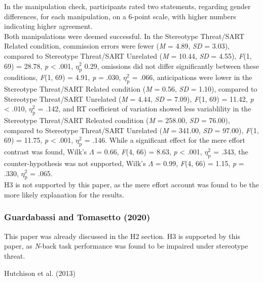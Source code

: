 \documentclass[
  stu,floatsintext]{apa7}
\begin{document}
In the manipulation check, participants rated two statements, regarding gender differences, for each manipulation, on a 6-point scale, with higher numbers indicating higher agreement.\\
Both manipulations were deemed successful.
In the Stereotype Threat/SART Related condition, commission errors were fewer (\emph{M} = 4.89, \emph{SD} = 3.03), compared to Stereotype Threat/SART Unrelated (\emph{M} = 10.44, \emph{SD} = 4.55), \emph{F}(1, 69) = 28.78, \emph{p} \textless{} .001, \(\eta^{2}_{\text{p}}\) 0.29, omissions did not differ significantly between these conditions, \emph{F}(1, 69) = 4.91, \emph{p} = .030, \(\eta^{2}_{\text{p}}\) = .066, anticipations were lower in the Stereotype Threat/SART Related condition (\emph{M} = 0.56, \emph{SD} = 1.10), compared to Stereotype Threat/SART Unrelated (\emph{M} = 4.44, \emph{SD} = 7.09), \emph{F}(1, 69) = 11.42, \emph{p} \textless{} .010, \(\eta^{2}_{\text{p}}\) = .142, and RT coefficient of variation showed less variablility in the Stereotype Threat/SART Releated condition (\emph{M} = 258.00, \emph{SD} = 76.00), compared to Stereotype Threat/SART Unrelated (\emph{M} = 341.00, \emph{SD} = 97.00), \emph{F}(1, 69) = 11.75, \emph{p} \textless{} .001, \(\eta^{2}_{\text{p}}\) = .146.
While a significant effect for the mere effort contrast was found, Wilk's \(\Lambda\) = 0.66, \emph{F}(4, 66) = 8.63, \emph{p} \textless{} .001, \(\eta^{2}_{\text{p}}\) = .343, the counter-hypothesis was not supported, Wilk's \(\Lambda\) = 0.99, \emph{F}(4, 66) = 1.15, \emph{p} = .330, \(\eta^{2}_{\text{p}}\) = .065.\\
H3 is not supported by this paper, as the mere effort account was found to be the more likely explanation for the results.

\subsubsection{Guardabassi and Tomasetto (2020)}\label{guardabassiweightstatusweight2020-1}

This paper was already discussed in the H2 section.
H3 is supported by this paper, as \emph{N}-back task performance was found to be impaired under stereotype threat.

Hutchison et al. (2013)
\end{document}

